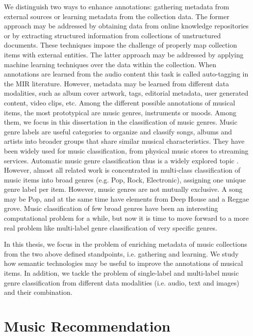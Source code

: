 We distinguish two ways to enhance annotations: gathering metadata from external sources or learning metadata from the collection data. The former approach may be addressed by obtaining data from online knowledge repositories or by extracting structured information from collections of unstructured documents. These techniques impose the challenge of properly map collection items with external entities. The latter approach may be addressed by applying machine learning techniques over the data within the collection. When annotations are learned from the audio content this task is called auto-tagging in the MIR literature. However, metadata may be learned from different data modalities, such as album cover artwork, tags, editorial metadata, user generated content, video clips, etc.
Among the different possible annotations of musical items, the most prototypical are music genres, instruments or moods. Among them, we focus in this dissertation in the classification of music genres.
Music genre labels are useful categories to organize and classify songs, albums and artists into broader groups that share similar musical characteristics. They have been widely used for music classification, from physical music stores to streaming services. Automatic music genre classification thus is a widely explored topic \citep{sturm2012survey}.
However, almost all related work is concentrated in multi-class classification of music items into broad genres (e.g. Pop, Rock, Electronic), assigning one unique genre label per item. However, music genres are not mutually exclusive. A song may be Pop, and at the same time have elements from Deep House and a Reggae grove. 
Music classification of few broad genres have been an interesting computational problem for a while, but now it is time to move forward to a more real problem like multi-label genre classification of very specific genres.

In this thesis, we focus in the problem of enriching metadata of music collections from the two above defined standpoints, i.e. gathering and learning. We study how semantic technologies may be useful to improve the annotations of musical items. In addition, we tackle the problem of single-label and multi-label music genre classification from different data modalities (i.e. audio, text and images) and their combination.


\section{Music Recommendation}

